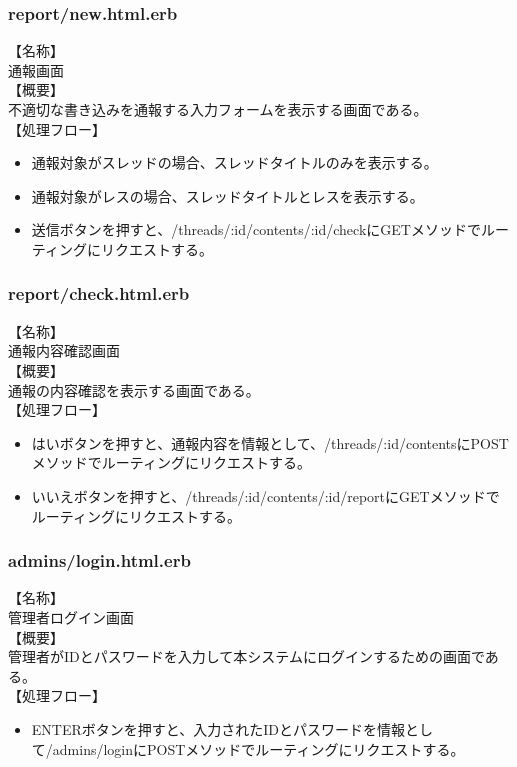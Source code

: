 \documentclass[a4j]{jarticle}
\begin{document}
\subsubsection{report/new.html.erb}
\noindent
【名称】\\
通報画面\\
【概要】\\
不適切な書き込みを通報する入力フォームを表示する画面である。\\
【処理フロー】
\begin{itemize}
  \item 通報対象がスレッドの場合、スレッドタイトルのみを表示する。
  \item 通報対象がレスの場合、スレッドタイトルとレスを表示する。
  \item 送信ボタンを押すと、/threads/:id/contents/:id/checkにGETメソッドでルーティングにリクエストする。
\end{itemize}

\subsubsection{report/check.html.erb}
\noindent
【名称】\\
通報内容確認画面\\
【概要】\\
通報の内容確認を表示する画面である。\\
【処理フロー】
\begin{itemize}
  \item はいボタンを押すと、通報内容を情報として、/threads/:id/contentsにPOSTメソッドでルーティングにリクエストする。
  \item いいえボタンを押すと、/threads/:id/contents/:id/reportにGETメソッドでルーティングにリクエストする。
\end{itemize}

\subsubsection{admins/login.html.erb}
\noindent
【名称】\\
管理者ログイン画面\\
【概要】\\
管理者がIDとパスワードを入力して本システムにログインするための画面である。\\
【処理フロー】
\begin{itemize}
  \item ENTERボタンを押すと、入力されたIDとパスワードを情報として/admins/loginにPOSTメソッドでルーティングにリクエストする。
\end{itemize}
\end{document}
